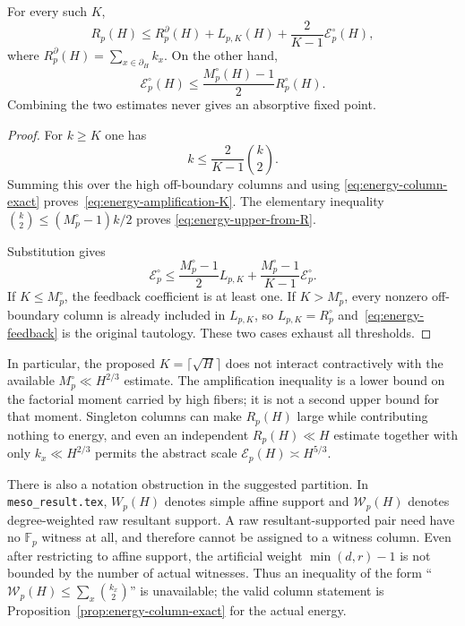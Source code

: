 \begin{proposition}
\label{prop:energy-fixed-point-audit}
For every such $K$,
\begin{equation}\label{eq:energy-amplification-K}
 R_p(H)\leq R_p^\partial(H)+L_{p,K}(H)
 +\frac{2}{K-1}\mathcal E_p^\circ(H),
\end{equation}
where $R_p^\partial(H)=\sum_{x\in\partial_H}k_x$.  On the other hand,
\begin{equation}\label{eq:energy-upper-from-R}
 \mathcal E_p^\circ(H)
 \leq\frac{M_p^\circ(H)-1}{2}R_p^\circ(H).
\end{equation}
Combining the two estimates never gives an absorptive fixed point.
\end{proposition}

\begin{proof}
For $k\geq K$ one has
\[
 k\leq\frac{2}{K-1}\binom{k}{2}.
\]
Summing this over the high off-boundary columns and using
\eqref{eq:energy-column-exact} proves~\eqref{eq:energy-amplification-K}.
The elementary inequality
$\binom{k}{2}\leq(M_p^\circ-1)k/2$ proves
\eqref{eq:energy-upper-from-R}.

Substitution gives
\begin{equation}\label{eq:energy-feedback}
 \mathcal E_p^\circ
 \leq\frac{M_p^\circ-1}{2}L_{p,K}
 +\frac{M_p^\circ-1}{K-1}\mathcal E_p^\circ.
\end{equation}
If $K\leq M_p^\circ$, the feedback coefficient is at least one.  If
$K>M_p^\circ$, every nonzero off-boundary column is already included in
$L_{p,K}$, so $L_{p,K}=R_p^\circ$ and~\eqref{eq:energy-feedback} is the
original tautology.  These two cases exhaust all thresholds.
\end{proof}

In particular, the proposed $K=\lceil\sqrt H\rceil$ does not interact
contractively with the available $M_p^\circ\ll H^{2/3}$ estimate.  The
amplification inequality is a lower bound on the factorial moment carried
by high fibers; it is not a second upper bound for that moment.  Singleton
columns can make $R_p(H)$ large while contributing nothing to energy, and
even an independent $R_p(H)\ll H$ estimate together with only
$k_x\ll H^{2/3}$ permits the abstract scale
$\mathcal E_p(H)\asymp H^{5/3}$.

There is also a notation obstruction in the suggested partition.  In
\texttt{meso\_result.tex}, $W_p(H)$ denotes simple affine support and
$\mathcal W_p(H)$ denotes degree-weighted raw resultant support.  A raw
resultant-supported pair need have no $\mathbb F_p$ witness at all, and
therefore cannot be assigned to a witness column.  Even after restricting
to affine support, the artificial weight $\min(d,r)-1$ is not bounded by
the number of actual witnesses.  Thus an inequality of the form
``$\mathcal W_p(H)\leq\sum_x\binom{k_x}{2}$'' is unavailable; the valid
column statement is Proposition~\ref{prop:energy-column-exact} for the
actual energy.

